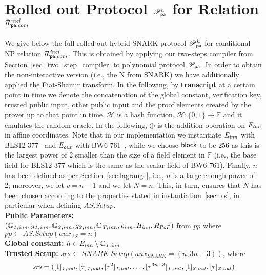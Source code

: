 \section{Rolled out Protocol $\mathscr{P}_{\mathsf{pa}}^{h}$ for Relation $\mathcal{R}^{\mathit{incl}}_{\mathsf{pa},\mathit{com}}$}
\label{sec:rolled_out}

\noindent We give below the full rolled-out hybrid SNARK protocol $\mathscr{P}_{\mathsf{pa}}^{h}$ for conditional NP relation $\mathcal{R}^{\mathit{incl}}_{\mathsf{pa},\mathit{com}}$. This is obtained by applying 
our two-steps compiler from Section~\ref{sec_two_step_compiler} to polynomial protocol $\mathscr{P}_{\mathsf{pa}}$. In order to obtain the non-interactive version 
(i.e., the N from SNARK) we have additionally applied the Fiat-Shamir transform. In the following, by \textbf{transcript} at a certain point in time we denote the concatenation 
of the global constant, verification key, trusted public input, other public input and the proof elements created by the prover up to that point in time.
\noindent $\mathcal{H}$ is a hash function, $\mathcal{H}: \{0, 1\} \rightarrow \mathbb{F}$ and it emulates the random oracle.  
In the following, $\oplus$ is the addition operation on $\mathit{E}_{\mathit{inn}}$ in affine coordinates. Note that in our implementation we instantiate 
$\mathit{E}_{\mathit{inn}}$ with BLS12-377~\cite{zexe} and $\mathit{E}_{\mathit{out}}$ with BW6-761~\cite{BW6}, while we choose $\mathsf{block}$ to be $256$ as this is the largest power of 2 smaller 
than the size of a field element in $\mathbb{F}$ (i.e., the base field for BLS12-377 which is the same as the scalar field of BW6-761). 
Finally, $n$ has been defined as per Section~\ref{sec:lagrange}, i.e., $n$ is a large enough power of 2; 
moreover, we let $v= n-1$ and we let $N = n$. This, in turn, ensures that $N$ has been chosen according to the properties stated in 
instantiation~\ref{sec:bls}, in particular when defining $\mathit{AS.Setup}$. \\

\noindent \textbf{Public Parameters:} \\
$(\mathbb{G}_{\mathit{1,inn}}, g_{\mathit{1,inn}}, \mathbb{G}_{\mathit{2,inn}}, g_{\mathit{2,inn}}, \mathbb{G}_{\mathit{T,inn}}, \mathit{e}_{\mathit{inn}}, \mathit{H}_{\mathit{inn}}, \mathit{H}_{\mathit{PoP}})$ from $\mathit{pp}$ 
where $\mathit{pp} \leftarrow \mathit{AS.Setup}(\mathit{aux_{\mathit{AS}}}= n)$ \\

\noindent \textbf{Global constant:} $h \in \mathit{E}_{\mathit{inn}} \setminus \mathbb{G}_{\mathit{1,inn}}$ \\ 

\noindent \textbf{Trusted Setup:} $\mathit{srs} \leftarrow \mathit{SNARK.Setup}(\mathit{aux_{\mathit{SNARK}}} = (n, 3n-3))$,  
where $$\mathit{srs} =([1]_{\mathit{1,out}}, [\tau]_{\mathit{1,out}}, [\tau^2]_{\mathit{1,out}}, \ldots, [\tau^{3n-3}]_{\mathit{1,out}}, [1]_{\mathit{2,out}}, [\tau]_{\mathit{2,out}})$$\\

